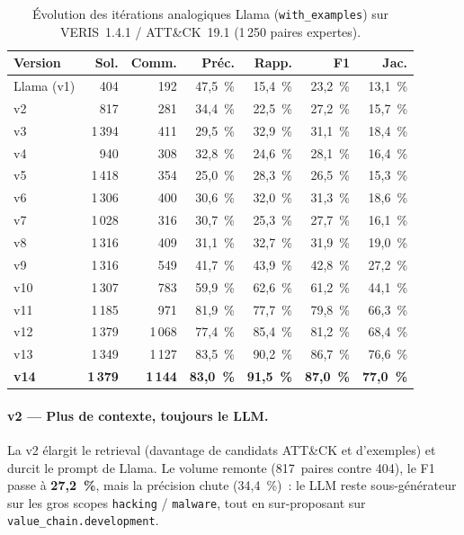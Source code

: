 \documentclass[a4paper,12pt]{article}
\begin{document}
\begin{table}[H]
  \centering
  \small
  \begin{tabular}{l r r r r r r}
    \toprule
    \textbf{Version} & \textbf{Sol.} & \textbf{Comm.} & \textbf{Préc.} & \textbf{Rapp.} & \textbf{F1} & \textbf{Jac.} \\
    \midrule
    Llama (v1) & 404 & 192 & 47,5~\% & 15,4~\% & 23,2~\% & 13,1~\% \\
    v2         & 817 & 281 & 34,4~\% & 22,5~\% & 27,2~\% & 15,7~\% \\
    v3         & 1\,394 & 411 & 29,5~\% & 32,9~\% & 31,1~\% & 18,4~\% \\
    v4         & 940 & 308 & 32,8~\% & 24,6~\% & 28,1~\% & 16,4~\% \\
    v5         & 1\,418 & 354 & 25,0~\% & 28,3~\% & 26,5~\% & 15,3~\% \\
    v6         & 1\,306 & 400 & 30,6~\% & 32,0~\% & 31,3~\% & 18,6~\% \\
    v7         & 1\,028 & 316 & 30,7~\% & 25,3~\% & 27,7~\% & 16,1~\% \\
    v8         & 1\,316 & 409 & 31,1~\% & 32,7~\% & 31,9~\% & 19,0~\% \\
    v9         & 1\,316 & 549 & 41,7~\% & 43,9~\% & 42,8~\% & 27,2~\% \\
    v10        & 1\,307 & 783 & 59,9~\% & 62,6~\% & 61,2~\% & 44,1~\% \\
    v11        & 1\,185 & 971 & 81,9~\% & 77,7~\% & 79,8~\% & 66,3~\% \\
    v12        & 1\,379 & 1\,068 & 77,4~\% & 85,4~\% & 81,2~\% & 68,4~\% \\
    v13        & 1\,349 & 1\,127 & 83,5~\% & 90,2~\% & 86,7~\% & 76,6~\% \\
    \textbf{v14} & \textbf{1\,379} & \textbf{1\,144} & \textbf{83,0~\%} & \textbf{91,5~\%} & \textbf{87,0~\%} & \textbf{77,0~\%} \\
    \bottomrule
  \end{tabular}
  \caption{Évolution des itérations analogiques Llama
  (\texttt{with\_examples}) sur VERIS~1.4.1 / ATT\&CK~19.1
  (1\,250 paires expertes).}
  \label{tab:rag-hybrid-summary}
\end{table}

\paragraph{v2 --- Plus de contexte, toujours le LLM.}
La v2 élargit le retrieval (davantage de candidats ATT\&CK et
d'exemples) et durcit le prompt de Llama. Le volume remonte
(817~paires contre 404), le F1 passe à \textbf{27,2~\%}, mais la
précision chute (34,4~\%)~: le LLM reste sous-générateur sur les
gros scopes \texttt{hacking} / \texttt{malware}, tout en
sur-proposant sur \texttt{value\_chain.development}.
\end{document}
